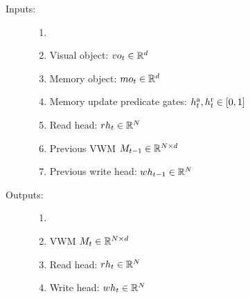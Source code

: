 
%
%
%	
%
%

\begin{description}
	\item[Inputs:] 
	\begin{enumerate}
		\item[]
		\item Visual object: $vo_t \in \mathbb{R}^d$
		\item Memory object: $mo_t \in \mathbb{R}^d$
		\item Memory update predicate gates:  $h^{\mathrm{a}}_t, h^{\mathrm{r}}_t \in [0,1]$
		\item Read head: $rh_t \in \mathbb{R}^N$
		\item Previous VWM $M_{t-1} \in \mathbb{R}^{N \times d}$
		\item Previous write head: $wh_{t-1} \in \mathbb{R}^N$
	\end{enumerate}
	
	\item[Outputs:] 
	\begin{enumerate}
		\item[]
		\item VWM $M_t \in \mathbb{R}^{N \times d}$
		\item Read head: $rh_t \in \mathbb{R}^N$
		\item Write head: $wh_t \in \mathbb{R}^N$
	\end{enumerate}
	
\end{description}



